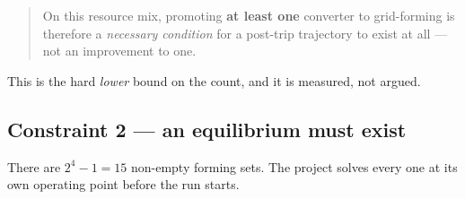 \documentclass[12pt,a4paper]{article}
\theoremstyle{remark}
\begin{document}
\begin{quote}
On this resource mix, promoting \textbf{at least one} converter to grid-forming
is therefore a \emph{necessary condition} for a post-trip trajectory to exist at
all --- not an improvement to one.
\end{quote}

This is the hard \emph{lower} bound on the count, and it is measured, not
argued.

\subsection{Constraint 2 --- an equilibrium must exist}

There are $2^4-1 = 15$ non-empty forming sets. The project solves every one at
its own operating point before the run starts.
\end{document}

